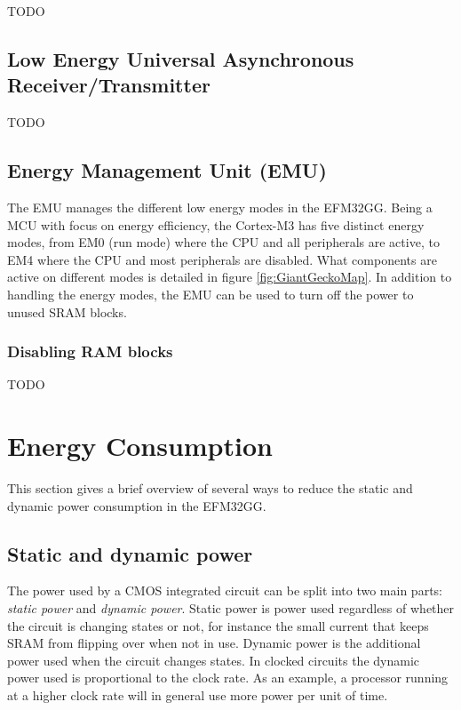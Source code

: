 TODO %


\subsection{Low Energy Universal Asynchronous Receiver/Transmitter}\label{subsec:leuart}
TODO %

\subsection{Energy Management Unit (EMU)}\label{sec:emu}
The EMU manages the different low energy modes in the EFM32GG. Being a MCU with focus on energy efficiency, the Cortex-M3 has five distinct energy modes, from EM0 (run mode) where the CPU and all peripherals are active, to EM4 where the CPU and most peripherals are disabled. What components are active on different modes is detailed in figure \ref{fig:GiantGeckoMap}. In addition to handling the energy modes, the EMU can be used to turn off the power to unused SRAM blocks.\cite{efm32gg-rm}

\subsubsection{Disabling RAM blocks}
TODO %


\section{Energy Consumption}
This section gives a brief overview of several ways to reduce the static and dynamic power consumption in the EFM32GG.

\subsection{Static and dynamic power}
The power used by a CMOS integrated circuit can be split into two main parts: \emph{static power} and \emph{dynamic power}. Static power is power used regardless of whether the circuit is changing states or not, for instance the small current that keeps SRAM from flipping over when not in use. Dynamic power is the additional power used when the circuit changes states. In clocked circuits the dynamic power used is proportional to the clock rate. As an example, a processor running at a higher clock rate will in general use more power per unit of time.\cite{efm32-energy-optimization}


